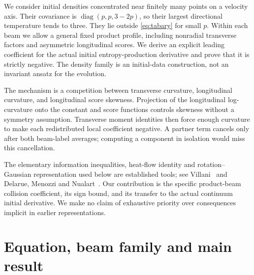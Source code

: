 \documentclass[11pt]{article}
\numberwithin{equation}{section}
\newcommand{\diag}{\operatorname{diag}}
\begin{document}
We consider initial densities concentrated near finitely many points on
a velocity axis. Their covariance is \(\diag(p,p,3-2p)\), so their
largest directional temperature tends to three. They lie outside
\eqref{eq:tabary} for small \(p\). Within each beam we allow a general
fixed product profile, including nonradial transverse factors and
asymmetric longitudinal scores. We derive an explicit leading
coefficient for the actual initial entropy-production derivative and
prove that it is strictly negative. The density family is an initial-data
construction, not an invariant ansatz for the evolution.

The mechanism is a competition between transverse curvature,
longitudinal curvature, and longitudinal score skewness. Projection of
the longitudinal log-curvature onto the constant and score functions
controls skewness without a symmetry assumption. Transverse moment
identities then force enough curvature to make each redistributed local
coefficient negative. A partner term cancels only after both beam-label
averages; computing a component in isolation would miss this cancellation.

The elementary information inequalities, heat-flow identity and
rotation--Gaussian representation used below are established tools; see
Villani~\cite{Villani2025} and Delarue, Menozzi and
Nualart~\cite[Proposition 2.3]{DMN2014}. Our contribution is the specific
product-beam collision coefficient, its sign bound, and its transfer to
the actual continuum initial derivative. We make no claim of exhaustive
priority over consequences implicit in earlier representations.

\section{Equation, beam family and main result}
\end{document}
